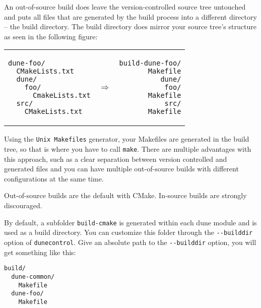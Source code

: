 \documentclass[a4paper,10pt,DIV9,headings=small]{scrartcl}
\begin{document}
An out-of-source build does leave the version-controlled source tree untouched and puts all files that are
generated by the build process into a different directory -- the build directory. The build directory does mirror
your source tree's structure as seen in the following figure:
\begin{center}
\begin{tabular}{lcr}
\begin{minipage}{.4\textwidth}
\begin{verbatim}
dune-foo/
  CMakeLists.txt
  dune/
    foo/
      CmakeLists.txt
  src/
    CMakeLists.txt
\end{verbatim}
\end{minipage} &
$\Rightarrow$ &
\begin{minipage}{.4\textwidth}
\begin{verbatim}
build-dune-foo/
  Makefile
  dune/
    foo/
      Makefile
  src/
    Makefile
\end{verbatim}
\end{minipage}
\end{tabular}
\end{center}
Using the \lstinline!Unix Makefiles! generator, your Makefiles are generated in the build tree, so that is where you
have to call \lstinline!make!. There are multiple advantages with this approach, such as a clear separation between
version controlled and generated files and you can have multiple out-of-source builds with different configurations
at the same time.

Out-of-source builds are the default with CMake. In-source builds are strongly discouraged.

By default, a subfolder \verb!build-cmake! is generated within each dune module and is used as a build directory. You can customize this folder through the \verb!--builddir! option of \verb!dunecontrol!. Give an absolute path to the \verb!--builddir! option, you will get something like this:

\begin{center}
 \begin{verbatim}
build/
  dune-common/
    Makefile
  dune-foo/
    Makefile
\end{verbatim}
\end{center}
\end{document}
